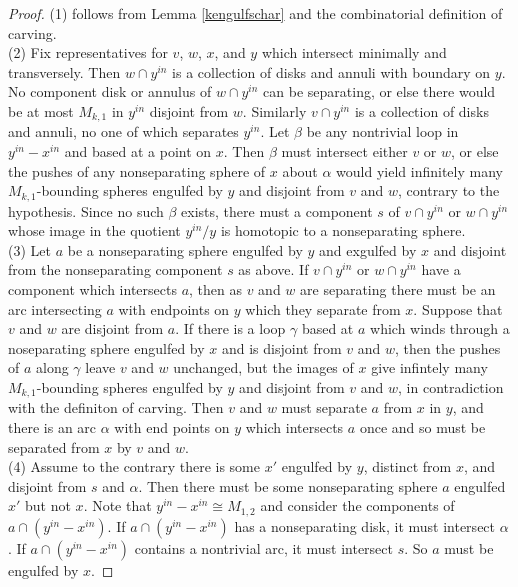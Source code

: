 \documentclass[11pt]{article}
\theoremstyle{remark}
\theoremstyle{definition}
\begin{document}
\begin{proof}
  (1) follows from Lemma \ref{kengulfschar} and the combinatorial definition of carving.\\
  (2) Fix representatives for $v$, $w$, $x$, and $y$ which intersect minimally and transversely.
  Then $w\cap y^{in}$ is a collection of disks and annuli with boundary on $y$.
  No component disk or annulus of $w\cap y^{in}$ can be separating,
  or else there would be at most $M_{k,1}$ in $y^{in}$
  disjoint from $w$.
  Similarly $v\cap y^{in}$ is a collection of disks and annuli, no one of which separates $y^{in}$.
  Let $\beta$ be any nontrivial loop in $y^{in}-x^{in}$ and based at
  a point on $x$.
  Then $\beta$ must intersect either $v$ or $w$, or else
  the pushes of any nonseparating sphere of $x$ about $\alpha$
  would yield infinitely many $M_{k,1}$-bounding spheres engulfed by $y$
  and disjoint from $v$ and $w$, contrary to the hypothesis.
  Since no such $\beta$ exists,
  there must a component $s$ of $v\cap y^{in}$ or $w\cap y^{in}$
  whose image in the quotient
  $y^{in}/y$ is homotopic to a nonseparating sphere.\\
  (3) Let $a$ be a nonseparating sphere engulfed by $y$ and exgulfed by $x$
  and disjoint from the nonseparating component $s$ as above.
  If $v\cap y^{in}$ or $w\cap y^{in}$
  have a component which intersects $a$, then as $v$ and $w$ are separating there
  must be an arc intersecting $a$ with endpoints on $y$ which they separate from $x$.
  Suppose that $v$ and $w$ are disjoint from $a$.
  If there is a loop $\gamma$ based at $a$ which winds through a noseparating sphere engulfed by $x$
  and is disjoint from $v$ and $w$,
  then the pushes of $a$ along $\gamma$ leave $v$ and $w$ unchanged,
  but the images of $x$ give infintely many $M_{k,1}$-bounding spheres
  engulfed by $y$ and disjoint from $v$ and $w$, in contradiction
  with the definiton of carving.
  Then $v$ and $w$ must separate $a$ from $x$ in $y$, and there is an
  arc $\alpha$ with end points on $y$ which intersects $a$ once and
  so must be separated from $x$ by $v$ and $w$.\\
  (4) Assume to the contrary there is some $x'$ engulfed by $y$,
   distinct from $x$,
   and disjoint from $s$ and $\alpha$.
   Then there must be some nonseparating sphere $a$ engulfed $x'$ but not $x$.
   Note that $y^{in}-x^{in} \cong M_{1,2}$
   and consider the components of $a \cap (y^{in}-x^{in})$.
   If $a \cap (y^{in}-x^{in})$ has a nonseparating disk,
   it must intersect $\alpha$.
   If $a \cap (y^{in}-x^{in})$ contains a nontrivial arc,
   it must intersect $s$. So $a$ must be engulfed by $x$.
\end{proof}
\end{document}
